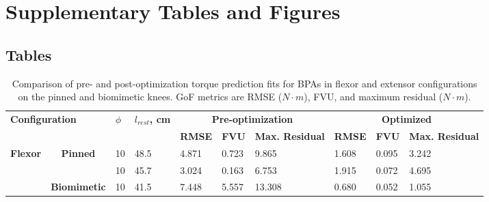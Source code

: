 \documentclass[utf8]{frontiers_suppmat} %
\begin{document}
\onecolumn
{}
\title[Supplementary Material]{{}}
\maketitle

\section{Supplementary Tables and Figures}

\subsection{Tables}

\begin{table}[htbp]
\caption{Comparison of pre- and post-optimization torque prediction fits for BPAs in flexor and extensor configurations on the pinned and biomimetic knees. GoF metrics are RMSE ($N \cdot m$), FVU, and maximum residual ($N \cdot m$).}
\label{tab:TorqueFit}
\resizebox{\textwidth}{!}
{%
\begin{tabular}{|cc|l|l|lll|lll|}
\hline
\multicolumn{2}{|l|}{\multirow{2}{*}{\textbf{Configuration}}} &
  \multirow{2}{*}{\textbf{$\phi$}} &
  \multirow{2}{*}{\textbf{$l_{rest}$, cm}} &
  \multicolumn{3}{c|}{\textbf{Pre-optimization}} &
  \multicolumn{3}{c|}{\textbf{Optimized}} \\ \cline{5-10} 
\multicolumn{2}{|l|}{} &
   &
   &
  \multicolumn{1}{l|}{\textbf{RMSE}} &
  \multicolumn{1}{l|}{\textbf{FVU}} &
  \textbf{Max. Residual} &
  \multicolumn{1}{l|}{\textbf{RMSE}} &
  \multicolumn{1}{l|}{\textbf{FVU}} &
  \textbf{Max. Residual} \\ \hline
\multicolumn{1}{|c|}{\multirow{4}{*}{\textbf{Flexor}}} &
  \multirow{2}{*}{\textbf{Pinned}} &
  10 &
  48.5 &
  \multicolumn{1}{l|}{4.871} &
  \multicolumn{1}{l|}{0.723} &
  9.865 &
  \multicolumn{1}{l|}{1.608} &
  \multicolumn{1}{l|}{0.095} &
  3.242 \\ \cline{3-10} 
\multicolumn{1}{|c|}{} &
   &
  10 &
  45.7 &
  \multicolumn{1}{l|}{3.024} &
  \multicolumn{1}{l|}{0.163} &
  6.753 &
  \multicolumn{1}{l|}{1.915} &
  \multicolumn{1}{l|}{0.072} &
  4.695 \\ \cline{2-10} 
\multicolumn{1}{|c|}{} &
  \multirow{2}{*}{\textbf{Biomimetic}} &
  10 &
  41.5 &
  \multicolumn{1}{l|}{7.448} &
  \multicolumn{1}{l|}{5.557} &
  13.308 &
  \multicolumn{1}{l|}{0.680} &
  \multicolumn{1}{l|}{0.052} &
  1.055 \\ \cline{3-10} 

\end{tabular}}
\end{table}
\end{document}
